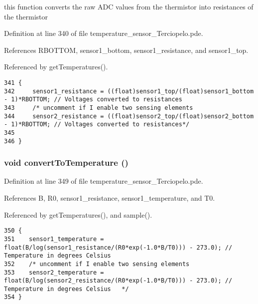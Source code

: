 this function converts the raw ADC values from the thermistor into resistances of the thermistor 



Definition at line 340 of file temperature\_\-sensor\_\-Terciopelo.pde.

References RBOTTOM, sensor1\_\-bottom, sensor1\_\-resistance, and sensor1\_\-top.

Referenced by getTemperatures().

\begin{Code}\begin{verbatim}341 {
342     sensor1_resistance = ((float)sensor1_top/(float)sensor1_bottom - 1)*RBOTTOM; // Voltages converted to resistances
343     /* uncomment if I enable two sensing elements
344     sensor2_resistance = ((float)sensor2_top/(float)sensor2_bottom - 1)*RBOTTOM; // Voltages converted to resistances*/
345  
346 }
\end{verbatim}
\end{Code}


\hypertarget{temperature__sensor___terciopelo_8pde_3aa4f99331713009a70ee34eba83754b}{
\subsubsection[{convertToTemperature}]{\setlength{\rightskip}{0pt plus 5cm}void convertToTemperature ()}}
\label{temperature__sensor___terciopelo_8pde_3aa4f99331713009a70ee34eba83754b}




Definition at line 349 of file temperature\_\-sensor\_\-Terciopelo.pde.

References B, R0, sensor1\_\-resistance, sensor1\_\-temperature, and T0.

Referenced by getTemperatures(), and sample().

\begin{Code}\begin{verbatim}350 {
351    sensor1_temperature = float(B/log(sensor1_resistance/(R0*exp(-1.0*B/T0))) - 273.0); // Temperature in degrees Celsius
352    /* uncomment if I enable two sensing elements
353    sensor2_temperature = float(B/log(sensor2_resistance/(R0*exp(-1.0*B/T0))) - 273.0); // Temperature in degrees Celsius   */
354 }
\end{verbatim}
\end{Code}


